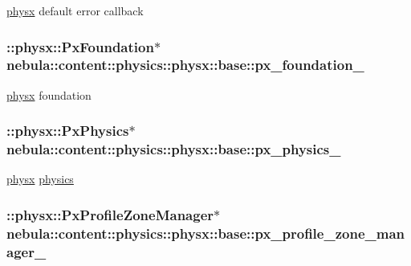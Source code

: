 \hyperlink{namespacenebula_1_1content_1_1physics_1_1physx}{physx} default error callback \hypertarget{classnebula_1_1content_1_1physics_1_1physx_1_1base_a4faae8c31e70ede63e29fbecc8b7303b}{
\subsubsection[{px\_\-foundation\_\-}]{\setlength{\rightskip}{0pt plus 5cm}::physx::PxFoundation$\ast$ {\bf nebula::content::physics::physx::base::px\_\-foundation\_\-}}}
\label{classnebula_1_1content_1_1physics_1_1physx_1_1base_a4faae8c31e70ede63e29fbecc8b7303b}


\hyperlink{namespacenebula_1_1content_1_1physics_1_1physx}{physx} foundation \hypertarget{classnebula_1_1content_1_1physics_1_1physx_1_1base_aa8569529e7ba22a5fe20bb7cde8e7b7e}{
\subsubsection[{px\_\-physics\_\-}]{\setlength{\rightskip}{0pt plus 5cm}::physx::PxPhysics$\ast$ {\bf nebula::content::physics::physx::base::px\_\-physics\_\-}}}
\label{classnebula_1_1content_1_1physics_1_1physx_1_1base_aa8569529e7ba22a5fe20bb7cde8e7b7e}


\hyperlink{namespacenebula_1_1content_1_1physics_1_1physx}{physx} \hyperlink{namespacenebula_1_1content_1_1physics}{physics} \hypertarget{classnebula_1_1content_1_1physics_1_1physx_1_1base_af07122412b147ba1a51c6d71db55a750}{
\subsubsection[{px\_\-profile\_\-zone\_\-manager\_\-}]{\setlength{\rightskip}{0pt plus 5cm}::physx::PxProfileZoneManager$\ast$ {\bf nebula::content::physics::physx::base::px\_\-profile\_\-zone\_\-manager\_\-}}}
\label{classnebula_1_1content_1_1physics_1_1physx_1_1base_af07122412b147ba1a51c6d71db55a750}


